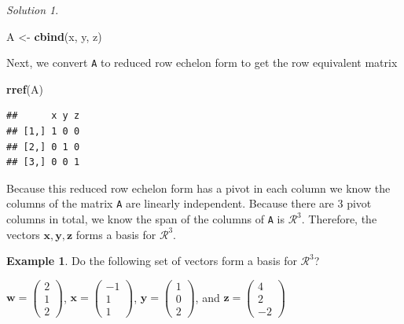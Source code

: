 \documentclass[
]{book}
\newenvironment{Shaded}{\begin{snugshade}}{\end{snugshade}}
\newcommand{\KeywordTok}[1]{\textcolor[rgb]{0.13,0.29,0.53}{\textbf{#1}}}
\newcommand{\NormalTok}[1]{#1}
\newcommand{\StringTok}[1]{\textcolor[rgb]{0.31,0.60,0.02}{#1}}
\theoremstyle{definition}
\theoremstyle{definition}
\newtheorem{example}{Example}[chapter]
\theoremstyle{definition}
\theoremstyle{definition}
\theoremstyle{remark}
\newtheorem*{solution}{Solution}
\begin{document}
\begin{solution}
\begin{Shaded}
\begin{Highlighting}[]
\NormalTok{A <-}\StringTok{ }\KeywordTok{cbind}\NormalTok{(x, y, z)}
\end{Highlighting}
\end{Shaded}

Next, we convert \texttt{A} to reduced row echelon form to get the row equivalent matrix

\begin{Shaded}
\begin{Highlighting}[]
\KeywordTok{rref}\NormalTok{(A)}
\end{Highlighting}
\end{Shaded}

\begin{verbatim}
##      x y z
## [1,] 1 0 0
## [2,] 0 1 0
## [3,] 0 0 1
\end{verbatim}

Because this reduced row echelon form has a pivot in each column we know the columns of the matrix \texttt{A} are linearly independent. Because there are 3 pivot columns in total, we know the span of the columns of \texttt{A} is \(\mathcal{R}^3\). Therefore, the vectors \(\mathbf{x}, \mathbf{y}, \mathbf{z}\) forms a basis for \(\mathcal{R}^3\).
\end{solution}

\begin{example}
Do the following set of vectors form a basis for \(\mathcal{R}^3\)?

\(\mathbf{w} = \begin{pmatrix} 2 \\ 1 \\ 2 \end{pmatrix}\), \(\mathbf{x} = \begin{pmatrix} -1 \\ 1 \\ 1 \end{pmatrix}\), \(\mathbf{y} = \begin{pmatrix} 1 \\ 0 \\ 2 \end{pmatrix}\), and \(\mathbf{z} = \begin{pmatrix} 4 \\ 2 \\ -2 \end{pmatrix}\)
\end{example}
\end{document}
